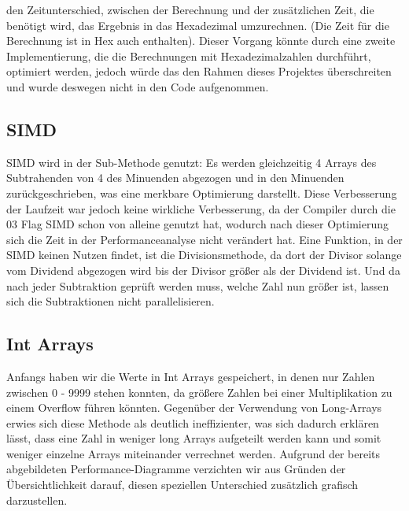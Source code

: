 \documentclass[course=erap]{aspdoc}
\begin{document}
\begin{figure}[ht]
                                                                                                                                                                                                                                                                                                                                                                                                                                                                                                                                                                                                                                                                                                                                                                                                                                                                                       \label{HexDec}
    \end{figure} den Zeitunterschied, zwischen der Berechnung und der zusätzlichen Zeit, die benötigt wird, das Ergebnis in das Hexadezimal umzurechnen. (Die Zeit für die Berechnung ist in Hex auch enthalten). Dieser Vorgang könnte durch eine zweite Implementierung, die die Berechnungen mit Hexadezimalzahlen durchführt, optimiert werden, jedoch würde das den Rahmen dieses Projektes überschreiten und wurde deswegen nicht in den Code aufgenommen.
    \subsection{SIMD}
    SIMD wird in der Sub-Methode genutzt: Es werden gleichzeitig 4 Arrays des Subtrahenden von 4 des Minuenden abgezogen und in den Minuenden zurückgeschrieben, was eine merkbare Optimierung darstellt. Diese Verbesserung der Laufzeit war jedoch keine wirkliche Verbesserung, da der Compiler durch die 03 Flag SIMD schon von alleine genutzt hat, wodurch nach dieser Optimierung sich die Zeit in der Performanceanalyse nicht verändert hat.
    Eine Funktion, in der SIMD keinen Nutzen findet, ist die Divisionsmethode, da dort der Divisor solange vom Dividend abgezogen wird bis der Divisor größer als der Dividend ist. Und da nach jeder Subtraktion geprüft werden muss, welche Zahl nun größer ist, lassen sich die Subtraktionen nicht parallelisieren.
    \subsection{Int Arrays}
    Anfangs haben wir die Werte in Int Arrays gespeichert, in denen nur Zahlen zwischen 0 - 9999 stehen konnten, da größere Zahlen bei einer Multiplikation zu einem Overflow führen könnten. Gegenüber der Verwendung von Long-Arrays erwies sich diese Methode als deutlich ineffizienter, was sich dadurch erklären lässt, dass eine Zahl in weniger long Arrays aufgeteilt werden kann und somit weniger einzelne Arrays miteinander verrechnet werden. Aufgrund der bereits abgebildeten Performance-Diagramme verzichten wir aus Gründen der Übersichtlichkeit darauf, diesen speziellen Unterschied zusätzlich grafisch darzustellen.
\end{document}
